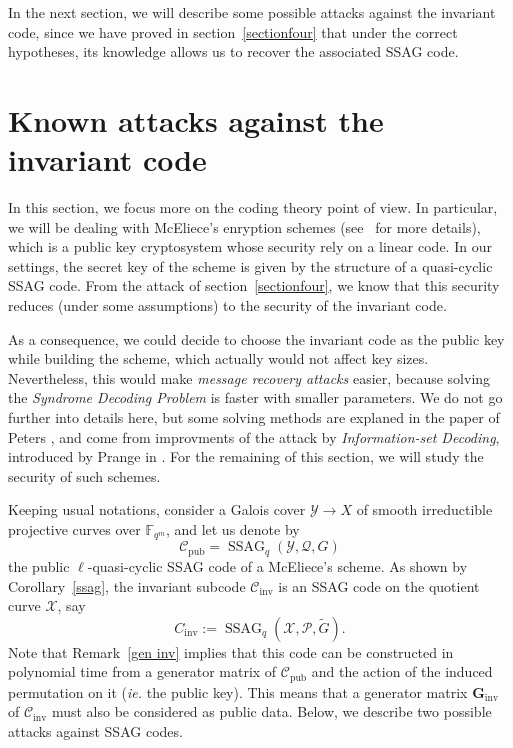 \documentclass[10pt]{article}
\theoremstyle{definition}
\theoremstyle{definition}
\theoremstyle{definition}
\newcommand{\C}{\mathcal{C}}
\newcommand{\fqm}{\mathbb{F}_{q^m}}
\newcommand{\X}{\mathcal{X}}
\newcommand{\Y}{\mathcal{Y}}
\newcommand{\PR}{\mathcal{P}}
\newcommand{\QR}{\mathcal{Q}}
\newcommand{\ssag}{\operatorname{SSAG}}
\begin{document}
In the next section, we will describe some possible attacks against the invariant code, since we have proved in section~\ref{sectionfour} that under the correct hypotheses, its knowledge allows us to recover the associated SSAG code.


\section{Known attacks against the invariant code} \label{section6}


In this section, we focus more on the coding theory point of view. In particular, we will be dealing with McEliece's enryption schemes (see~\cite{McE} for more details), which is a public key cryptosystem whose security rely on a linear code. In our settings, the secret key of the scheme is given by the structure of a quasi-cyclic SSAG code. From the attack of section~\ref{sectionfour}, we know that this security reduces (under some assumptions) to the security of the invariant code. 

\vspace*{0.2cm}

\noindent As a consequence, we could decide to choose the invariant code as the public key while building the scheme, which actually would not affect key sizes. Nevertheless, this would make \textit{message recovery attacks} easier, because solving the \textit{Syndrome Decoding Problem} is faster with smaller parameters. We do not go further into details here, but some solving methods are explaned in the paper of Peters \cite{PET}, and come from improvments of the attack by \textit{Information-set Decoding}, introduced by Prange in \cite{PR62}. For the remaining of this section, we will study the security of such schemes.

\vspace*{0.2cm}

\noindent Keeping usual notations, consider a Galois cover $\Y \longrightarrow X$ of smooth irreductible projective curves over $\fqm$, and let us denote by 
\[\mathcal{C}_{\mathrm{pub}} = \ssag_q(\Y,\QR,G)\]
the public $\ell$-quasi-cyclic SSAG code of a McEliece's scheme.
As shown by Corollary~\ref{ssag}, the invariant subcode $\mathcal{C}_{\mathrm{inv}}$ is an SSAG code on the quotient curve $\X$, say
\[C_{\mathrm{inv}} := \ssag_q(\X,\PR,\tilde{G}).\]
Note that Remark~\ref{gen inv} implies that this code can be constructed in polynomial time from a generator matrix of $\mathcal{C}_{\mathrm{pub}}$ and the action of the induced permutation on it (\textit{ie.} the public key). This means that a generator matrix $\mathbf{G}_{\mathrm{inv}}$ of $\C_{\mathrm{inv}}$ must also be considered as public data. Below, we describe two possible attacks against SSAG codes. 
\end{document}

